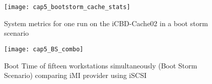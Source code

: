 \begin{figure}[htbp]
	\centering
	\texttt{[image: cap5\_bootstorm\_cache\_stats]}
	\caption{System metrics for one run on the iCBD-Cache02 in a boot storm scenario}
	\label{fig:bootstorm_cache_stats}
\end{figure}



\begin{figure}[htbp]
	\centering
	\texttt{[image: cap5\_BS\_combo]}
	\caption{Boot Time of fifteen workstations simultaneously (Boot Storm Scenario) comparing iMI provider using iSCSI}
	\label{fig:bootstorm_time}
\end{figure}




